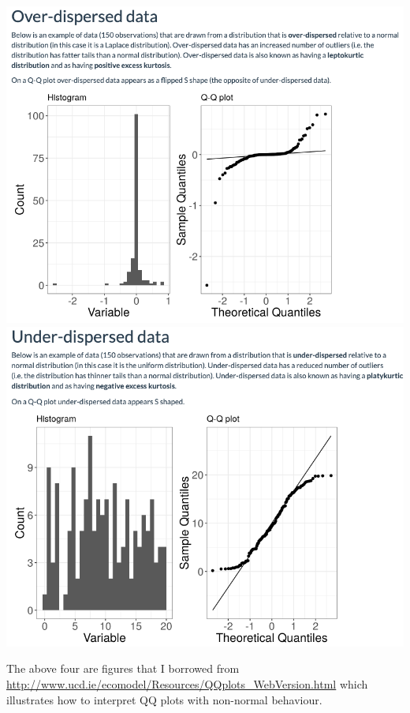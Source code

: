 \documentclass[11pt]{article}
\begin{document}
\begin{center}
    \includegraphics[scale=0.26]{img/qq_over.png}
    \includegraphics[scale=0.26]{img/qq_under.png}
\end{center}
The above four are figures that I borrowed from \url{http://www.ucd.ie/ecomodel/Resources/QQplots_WebVersion.html} which illustrates how to interpret QQ plots with non-normal behaviour.
\end{document}
